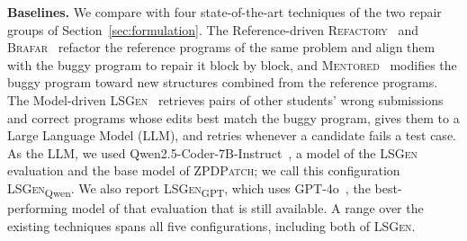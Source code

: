 \documentclass[conference]{IEEEtran}
\begin{document}
\noindent\textbf{Baselines.} We compare with four state-of-the-art techniques of the two repair groups of Section~\ref{sec:formulation}. The Reference-driven \textsc{Refactory}~\cite{hu2019re} and \textsc{Brafar}~\cite{xie2024brafar} refactor the reference programs of the same problem and align them with the buggy program to repair it block by block, and \textsc{Mentored}~\cite{choi2025automated} modifies the buggy program toward new structures combined from the reference programs. The Model-driven \textsc{LSGen}~\cite{dai2026learner} retrieves pairs of other students' wrong submissions and correct programs whose edits best match the buggy program, gives them to a Large Language Model (LLM), and retries whenever a candidate fails a test case. As the LLM, we used Qwen2.5-Coder-7B-Instruct~\cite{hui2024qwen2}, a model of the \textsc{LSGen} evaluation and the base model of \textsc{ZPDPatch}; we call this configuration \textsc{LSGen}\textsubscript{Qwen}. We also report \textsc{LSGen}\textsubscript{GPT}, which uses GPT-4o~\cite{hurst2024gpt}, the best-performing model of that evaluation that is still available. A range over the existing techniques spans all five configurations, including both of \textsc{LSGen}.
\end{document}
